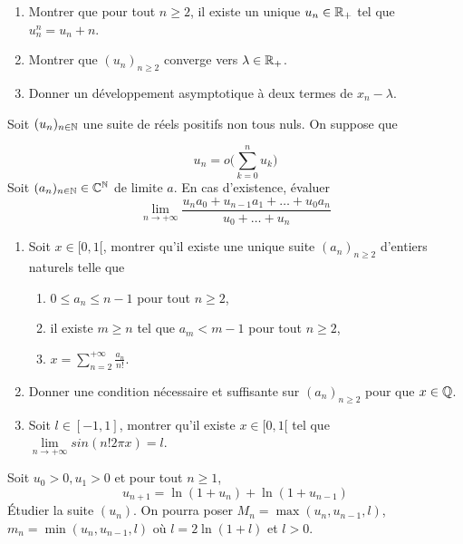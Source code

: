 \begin{exercise}
	\phantom{}
	\begin{enumerate}
		\item
		Montrer que pour tout $n\geqslant 2$, il existe un unique $u_{n}\in\mathbb{R}_{+}$
		tel que $u_{n}^{n}=u_{n}+n$.
		\item
		Montrer que $(u_{n})_{n\geqslant 2}$ converge vers $\lambda\in\mathbb{R}_{+}$.
		\item
		Donner un développement asymptotique à deux termes de $x_{n}-\lambda$.
	\end{enumerate}
\end{exercise}

\begin{exercise}
	Soit $(u_{n})_{n\in\mathbb{N}}$ une suite de réels positifs non tous nuls. On suppose
	que
	
	$$u_n=o\Biggl(\sum_{k=0}^{n}u_{k}\Biggr)$$ Soit $(a_{n})_{n\in\mathbb{N}}\in\mathbb{C}^{\mathbb{N}}$
	de limite $a$. En cas d'existence, évaluer
	$$\lim\limits_{n\to+\infty}\frac{u_{n}a_{0}+u_{n-1}a_{1}+\dots+u_{0}a_{n}}{u_{0}+\dots+u_{n}}$$
\end{exercise}

\begin{exercise}
	\phantom{}
	\begin{enumerate}
		\item
		Soit $x\in[0,1[$, montrer qu'il existe une unique suite
		$(a_{n})_{n\geqslant 2}$ d'entiers naturels telle que 
		\begin{enumerate}
			\item
			[(i)] $0\leqslant a_{n}\leqslant n-1$ pour tout $n\geqslant2$,
			\item
			[(ii)] il existe $m\geqslant n$ tel que $a_{m}<m-1$ pour tout
			$n\geqslant2$,
			\item
			[(iii)] $x=\sum_{n=2}^{+\infty}\frac{a_{n}}{n!}$.
		\end{enumerate}
		\item
		Donner une condition nécessaire et suffisante sur $(a_{n})_{n\geqslant2}$
		pour que $x\in\mathbb{Q}$.
		\item
		Soit $l\in[-1,1]$, montrer qu'il existe $x\in[0,1[$ tel que
		$\lim\limits_{n\to+\infty}sin(n!2\pi x)=l$.
	\end{enumerate}
\end{exercise}

\begin{exercise}
	Soit $u_0>0,u_1>0$ et pour tout $n\geqslant 1$,
	$$u_{n+1}=\ln(1+u_{n})+\ln(1+u_{n-1})$$ Étudier la suite $(u_{n})$. On pourra
	poser $M_{n}=\max(u_{n},u_{n-1},l)$, $m_{n}=\min(u_{n},u_{n-1},l)$ où
	$l=2\ln(1+l)$ et $l>0$.
\end{exercise}

